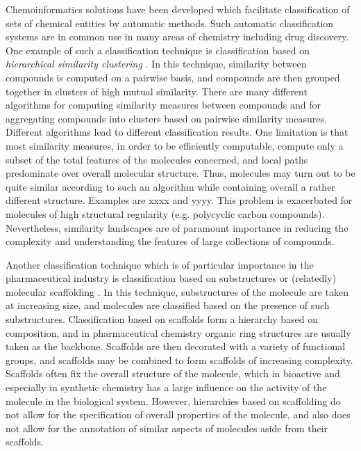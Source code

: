 \documentclass[10pt]{bmc_article}
\newenvironment{bmcformat}{\baselineskip20pt\sloppy\setboolean{publ}{false}}{\baselineskip20pt\sloppy}
\begin{document}
\begin{bmcformat}
Chemoinformatics solutions have been developed which facilitate classification of sets of chemical entities by automatic methods.  Such automatic classification systems are in common use in many areas of chemistry including drug discovery. One example of such a classification technique is classification based on \textit{hierarchical similarity clustering} \cite{barnard1992}.  In this technique, similarity between compounds is computed on a pairwise basis, and compounds are then grouped together in clusters of high mutual similarity. There are many different algorithms for computing similarity measures between compounds and for aggregating compounds into clusters based on pairwise similarity measures. Different algorithms lead to different classification results. 
One limitation is that most similarity measures, in order to be efficiently computable, compute only a subset of the total features of the molecules concerned, and local paths predominate over overall molecular structure. Thus, molecules may turn out to be quite similar according to such an algorithm while containing overall a rather different structure. Examples are xxxx and yyyy.  This problem is exacerbated for molecules of high structural regularity (e.g. polycyclic carbon compounds).  Nevertheless, similarity landscapes are of paramount importance in reducing the complexity and understanding the features of large collections of compounds. %

Another classification technique which is of particular importance in the pharmaceutical industry is classification based on substructures \cite{deshpande2005} or (relatedly) molecular scaffolding \cite{FindSomething}.  In this technique, substructures of the molecule are taken at increasing size, and molecules are classified based on the presence of such substructures.  Classification based on scaffolds form a hierarchy based on composition, and in pharmaceutical chemistry organic ring structures are usually taken as the backbone.  Scaffolds are then decorated with a variety of functional groups, and scaffolds may be combined to form scaffolds of increasing complexity. 
Scaffolds often fix the overall structure of the molecule, which in bioactive and especially in synthetic chemistry has a large influence on the activity of the molecule in the biological system.  However, hierarchies based on scaffolding do not allow for the specification of overall properties of the molecule, and also does not allow for the annotation of similar aspects of molecules aside from their scaffolds. 


\end{bmcformat}
\end{document}
